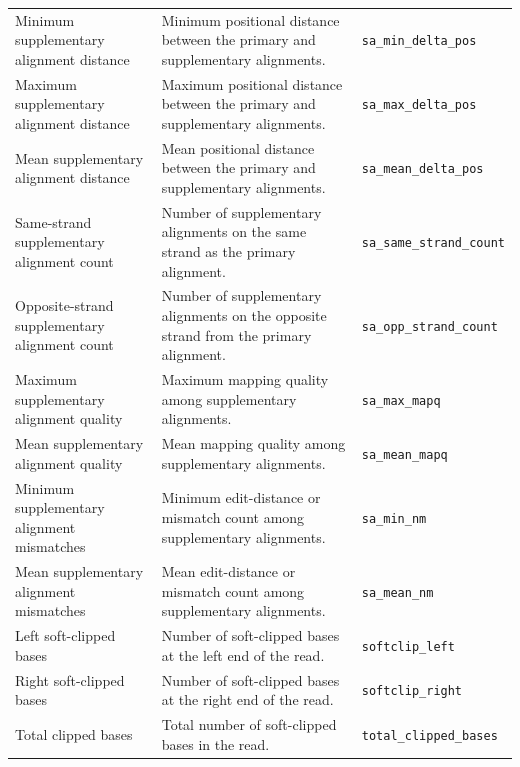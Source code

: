 \begin{xltabular}{\textwidth}{p{3.2cm} X p{3.1cm}}
Minimum supplementary alignment distance & Minimum positional distance between the primary and supplementary alignments. & \texttt{sa\_min\_delta\_pos} \\

Maximum supplementary alignment distance & Maximum positional distance between the primary and supplementary alignments. & \texttt{sa\_max\_delta\_pos} \\

Mean supplementary alignment distance & Mean positional distance between the primary and supplementary alignments. & \texttt{sa\_mean\_delta\_pos} \\

Same-strand supplementary alignment count & Number of supplementary alignments on the same strand as the primary alignment. & \texttt{sa\_same\_strand\_count} \\

Opposite-strand supplementary alignment count & Number of supplementary alignments on the opposite strand from the primary alignment. & \texttt{sa\_opp\_strand\_count} \\

Maximum supplementary alignment quality & Maximum mapping quality among supplementary alignments. & \texttt{sa\_max\_mapq} \\

Mean supplementary alignment quality & Mean mapping quality among supplementary alignments. & \texttt{sa\_mean\_mapq} \\

Minimum supplementary alignment mismatches & Minimum edit-distance or mismatch count among supplementary alignments. & \texttt{sa\_min\_nm} \\

Mean supplementary alignment mismatches & Mean edit-distance or mismatch count among supplementary alignments. & \texttt{sa\_mean\_nm} \\

Left soft-clipped bases & Number of soft-clipped bases at the left end of the read. & \texttt{softclip\_left} \\

Right soft-clipped bases & Number of soft-clipped bases at the right end of the read. & \texttt{softclip\_right} \\

Total clipped bases & Total number of soft-clipped bases in the read. & \texttt{total\_clipped\_bases} \\


\end{xltabular}
